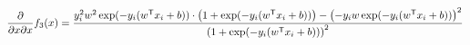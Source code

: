 \documentclass[12pt,landscape]{article}
\newcommand{\tr}{^\mathsf{T}}
\begin{document}
\begin{align*}
\frac{\partial}{\partial x \partial x} f_3(x) &= \frac{ y_i^2 w^2 \exp(-y_i(w\tr x_i + b)) \cdot \left(\dLogn\right) - \left( \dLogz \right)^2 } {\left(\dLogn\right)^2}\\
\end{align*}








\end{document}
